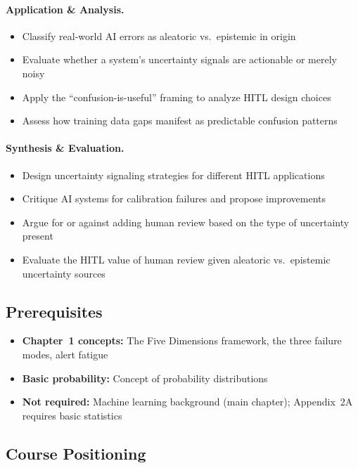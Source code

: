 \paragraph{Application \& Analysis.}
\begin{itemize}
    \item Classify real-world AI errors as aleatoric vs.\ epistemic in origin
    \item Evaluate whether a system's uncertainty signals are actionable or merely noisy
    \item Apply the ``confusion-is-useful'' framing to analyze HITL design choices
    \item Assess how training data gaps manifest as predictable confusion patterns
\end{itemize}

\paragraph{Synthesis \& Evaluation.}
\begin{itemize}
    \item Design uncertainty signaling strategies for different HITL applications
    \item Critique AI systems for calibration failures and propose improvements
    \item Argue for or against adding human review based on the type of uncertainty present
    \item Evaluate the HITL value of human review given aleatoric vs.\ epistemic uncertainty sources
\end{itemize}

\subsection{Prerequisites}
\begin{itemize}
    \item \textbf{Chapter~1 concepts:} The Five Dimensions framework, the three failure modes, alert fatigue
    \item \textbf{Basic probability:} Concept of probability distributions
    \item \textbf{Not required:} Machine learning background (main chapter); Appendix~2A requires basic statistics
\end{itemize}

\subsection{Course Positioning}


